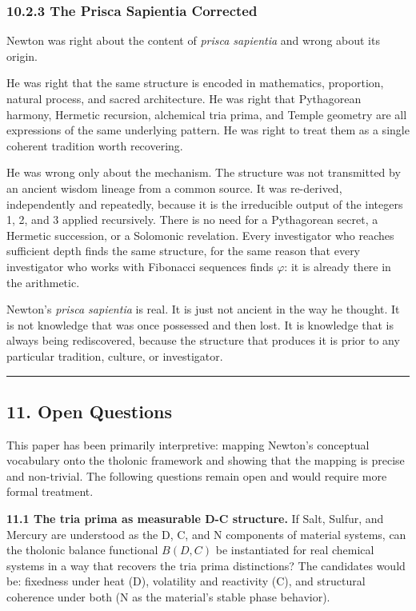 \documentclass[
  11pt,
  letterpaper,
]{article}
\begin{document}
\subsubsection{10.2.3 The Prisca Sapientia
Corrected}\label{the-prisca-sapientia-corrected}

Newton was right about the content of \emph{prisca sapientia} and wrong
about its origin.

He was right that the same structure is encoded in mathematics,
proportion, natural process, and sacred architecture. He was right that
Pythagorean harmony, Hermetic recursion, alchemical tria prima, and
Temple geometry are all expressions of the same underlying pattern. He
was right to treat them as a single coherent tradition worth recovering.

He was wrong only about the mechanism. The structure was not transmitted
by an ancient wisdom lineage from a common source. It was re-derived,
independently and repeatedly, because it is the irreducible output of
the integers 1, 2, and 3 applied recursively. There is no need for a
Pythagorean secret, a Hermetic succession, or a Solomonic revelation.
Every investigator who reaches sufficient depth finds the same
structure, for the same reason that every investigator who works with
Fibonacci sequences finds \(\varphi\): it is already there in the
arithmetic.

Newton's \emph{prisca sapientia} is real. It is just not ancient in the
way he thought. It is not knowledge that was once possessed and then
lost. It is knowledge that is always being rediscovered, because the
structure that produces it is prior to any particular tradition,
culture, or investigator.

\begin{center}\rule{0.5\linewidth}{0.5pt}\end{center}

\subsection{11. Open Questions}\label{open-questions}

This paper has been primarily interpretive: mapping Newton's conceptual
vocabulary onto the tholonic framework and showing that the mapping is
precise and non-trivial. The following questions remain open and would
require more formal treatment.

\textbf{11.1 The tria prima as measurable D-C structure.} If Salt,
Sulfur, and Mercury are understood as the D, C, and N components of
material systems, can the tholonic balance functional \(B(D, C)\) be
instantiated for real chemical systems in a way that recovers the tria
prima distinctions? The candidates would be: fixedness under heat (D),
volatility and reactivity (C), and structural coherence under both (N as
the material's stable phase behavior).
\end{document}
